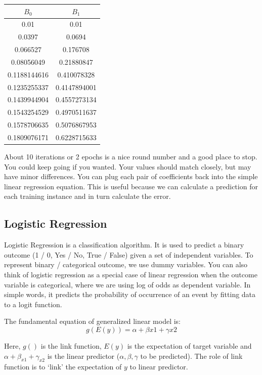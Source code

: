 \begin{center}
\begin{tabular}{|c|c|}
    \hline
    $B_{0}$ & $B_{1}$ \\ [0.5ex]
    \hline
    0.01 & 0.01 \\
    \hline
    0.0397 & 0.0694 \\
    \hline
    0.066527 & 0.176708 \\
    \hline
    0.08056049 & 0.21880847 \\
    \hline
    0.1188144616 & 0.410078328 \\
    \hline
    0.1235255337 & 0.4147894001 \\
    \hline
    0.1439944904 & 0.4557273134 \\
    \hline
    0.1543254529 & 0.4970511637 \\
    \hline
    0.1578706635 & 0.5076867953 \\
    \hline
    0.1809076171 & 0.6228715633 \\
    \hline
\end{tabular}
\end{center}

About 10 iterations or 2 epochs is a nice round number and a good place to stop. You could keep going if you wanted. Your values should match closely, but may have minor differences. You can plug each pair of coefficients back into the simple linear regression equation. This is useful because we can calculate a prediction for each training instance and in turn calculate the error.

\pagebreak

\subsection{Logistic Regression}

Logistic Regression is a classification algorithm. It is used to predict a binary outcome (1 / 0, Yes / No, True / False) given a set of independent variables. To represent binary / categorical outcome, we use dummy variables. You can also think of logistic regression as a special case of linear regression when the outcome variable is categorical, where we are using log of odds as dependent variable. In simple words, it predicts the probability of occurrence of an event by fitting data to a logit function.

The fundamental equation of generalized linear model is:
\[
    g(E(y)) = α + βx1 + γx2    
\]

Here, $g()$ is the link function, $E(y)$ is the expectation of target variable and $α + β_{x1} + γ_{x2}$ is the linear predictor ($α, β, γ$ to be predicted). The role of link function is to ‘link’ the expectation of $y$ to linear predictor.

